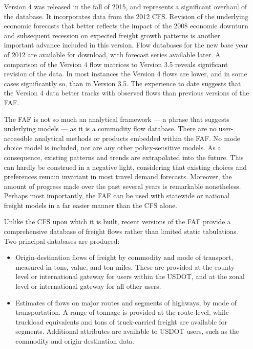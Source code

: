 Version 4 was released in the fall of 2015, and represents a significant overhaul of the database. It incorporates data from the 2012 CFS. Revision of the underlying economic forecasts that better reflects the impact of the 2008 economic downturn and subsequent recession on expected freight growth patterns is another important advance included in this version. Flow databases for the new base year of 2012 are available for download, with forecast series available later. A comparison of the Version 4 flow matrices to Version 3.5 reveals significant revision of the data. In most instances the Version 4 flows are lower, and in some cases significantly so, than in Version 3.5. The experience to date suggests that the Version 4 data better tracks with observed flows than previous versions of the FAF.

The FAF is not so much an analytical framework --- a phrase that suggests underlying models --- as it is a commodity flow database. There are no user-accessible analytical methods or products embedded within the FAF. No mode choice model is included, nor are any other policy-sensitive models. As a consequence, existing patterns and trends are extrapolated into the future. This can hardly be construed in a negative light, considering that existing choices and preferences remain invariant in most travel demand forecasts. Moreover, the amount of progress made over the past several years is remarkable nonetheless. Perhaps most importantly, the FAF can be used with statewide or national freight models in a far easier manner than the CFS alone.

Unlike the CFS upon which it is built, recent versions of the FAF provide a comprehensive database of freight flows rather than limited static tabulations. Two principal databases are produced:
\begin{itemize}
\item Origin-destination flows of freight by commodity and mode of transport, measured in tons, value, and ton-miles. These are provided at the county level or international gateway for users within the USDOT, and at the zonal level or international gateway for all other users.
\item Estimates of flows on major routes and segments of highways, by mode of transportation. A range of tonnage is provided at the route level, while truckload equivalents and tons of truck-carried freight are available for segments. Additional attributes are available to USDOT users, such as the commodity and origin-destination data.
\end{itemize}

